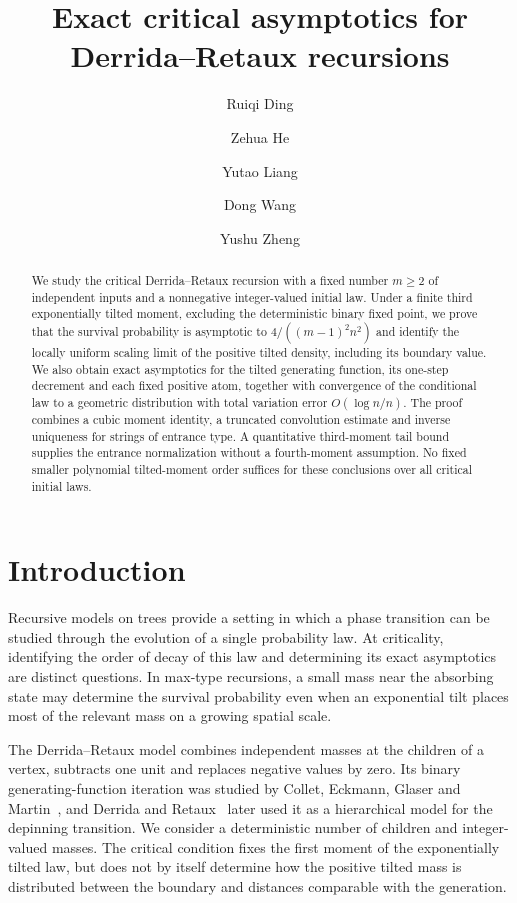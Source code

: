 \documentclass[11pt,letterpaper,reqno]{amsart}
\title[Critical Derrida--Retaux recursions]{Exact critical asymptotics for Derrida--Retaux recursions}
\author[R. Ding]{Ruiqi Ding\authormark{1,2,a}}
\author[Z. He]{Zehua He\authormark{1,2,b}}
\author[Y. Liang]{Yutao Liang\authormark{1,2,c}}
\author[D. Wang]{Dong Wang\authormark{2,d}}
\author[Y. Zheng]{Yushu Zheng\authormark{3,e}}
\date{}
\theoremstyle{plain}
\begin{document}
\begin{abstract}
We study the critical Derrida--Retaux recursion with a fixed number $m\ge2$ of independent inputs and a nonnegative integer-valued initial law. Under a finite third exponentially tilted moment, excluding the deterministic binary fixed point, we prove that the survival probability is asymptotic to $4/((m-1)^2n^2)$ and identify the locally uniform scaling limit of the positive tilted density, including its boundary value. We also obtain exact asymptotics for the tilted generating function, its one-step decrement and each fixed positive atom, together with convergence of the conditional law to a geometric distribution with total variation error $O(\log n/n)$. The proof combines a cubic moment identity, a truncated convolution estimate and inverse uniqueness for strings of entrance type. A quantitative third-moment tail bound supplies the entrance normalization without a fourth-moment assumption. No fixed smaller polynomial tilted-moment order suffices for these conclusions over all critical initial laws.
\end{abstract}
\maketitle

\section{Introduction}
Recursive models on trees provide a setting in which a phase transition can be studied through the evolution of a single probability law. At criticality, identifying the order of decay of this law and determining its exact asymptotics are distinct questions. In max-type recursions, a small mass near the absorbing state may determine the survival probability even when an exponential tilt places most of the relevant mass on a growing spatial scale.

The Derrida--Retaux model combines independent masses at the children of a vertex, subtracts one unit and replaces negative values by zero. Its binary generating-function iteration was studied by Collet, Eckmann, Glaser and Martin~\cite{CEGM}, and Derrida and Retaux~\cite{DR} later used it as a hierarchical model for the depinning transition. We consider a deterministic number of children and integer-valued masses. The critical condition fixes the first moment of the exponentially tilted law, but does not by itself determine how the positive tilted mass is distributed between the boundary and distances comparable with the generation.
\end{document}
